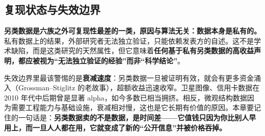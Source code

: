 \subsection{复现状态与失效边界}

\textbf{另类数据是六族之外可复现性最差的一类，原因与算法无关：数据本身是私有的。}私有数据上的结果，外部研究者无法独立验证，只能依赖发表方的自述。这不是学术缺陷，而是这类研究的天然属性，但它意味着\textbf{任何基于私有另类数据的高收益声明，都应被视为“无法独立验证的经验”而非“科学结论”}。

失效边界里最该警惕的是\textbf{衰减速度}：另类数据一旦被证明有效，就会有更多资金涌入（Grossman--Stiglitz 的老故事），超额收益迅速收窄。卫星图像、信用卡数据在 2010 年代中后期曾是显著 alpha，如今多数已相当拥挤。相反，微观结构数据因为需要工程能力与基础设施，衰减相对慢，这也是它长期有价值的原因。本章要记住的一句话是：\textbf{另类数据卖的不是数据，是时间差——它值钱只因为你比别人早用上，而一旦人人都在用，它就变成了新的“公开信息”并被价格吞掉。}
